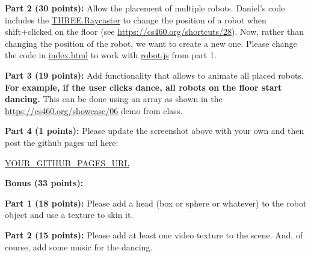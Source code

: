 \documentclass[10pt,oneside,onecolumn,letterpaper]{article}
\begin{document}
\vspace{.5cm}

\noindent\textbf{Part 2 (30 points):} Allow the placement of multiple robots. Daniel's code includes the \url{THREE.Raycaster} to change the position of a robot when shift+clicked on the floor (see \url{https://cs460.org/shortcuts/28}). Now, rather than changing the position of the robot, we want to create a new one. Please change the code in \url{index.html} to work with \url{robot.js} from part 1.

\vspace{.5cm}

\noindent\textbf{Part 3 (19 points):} Add functionality that allows to animate all placed robots. \textbf{For example, if the user clicks dance, all robots on the floor start dancing.} This can be done using an array as shown in the \url{https://cs460.org/showcase/06} demo from class.

\vspace{.5cm}

\noindent\textbf{Part 4 (1 points):} Please update the screenshot above with your own and then post the github pages url here:

\vspace{.5cm}

\url{YOUR_GITHUB_PAGES_URL}

\vspace{3cm}

\noindent\textbf{Bonus (33 points):}

\vspace{.5cm}

\noindent\textbf{Part 1 (18 points):} Please add a head (box or sphere or whatever) to the robot object and use a texture to skin it.

\vspace{.5cm}

\noindent\textbf{Part 2 (15 points):} Please add at least one video texture to the scene. And, of course, add some music for the dancing.
\end{document}
